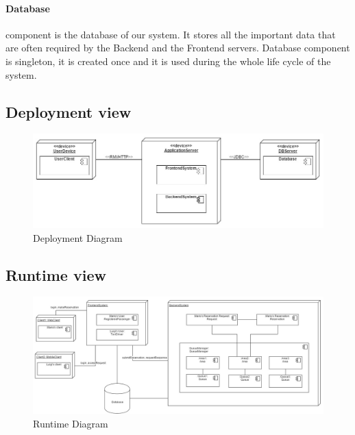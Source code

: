 		\paragraph{Database} component is the database of our system. It stores all the important data that are often required by the Backend and the Frontend servers. Database component is singleton, it is created once and it is used during the whole life cycle of the system.
	\begin{landscape}
	\subsection{Deployment view}
		\begin{figure}[h!]
			\begin{center}
				\includegraphics[width=0.9\linewidth]{../SE2_IMAGES/DeploymentDiagram}
				\caption{Deployment Diagram}
			\end{center}
		\end{figure}
	\end{landscape}
	\newpage
	\begin{landscape}
	\subsection{Runtime view}
		\begin{figure}[h!]
			\begin{center}
				\includegraphics[width=0.9\linewidth]{../SE2_IMAGES/RuntimeDiagram}
				\caption{Runtime Diagram}
			\end{center}
		\end{figure}
	\end{landscape}
	\newpage
